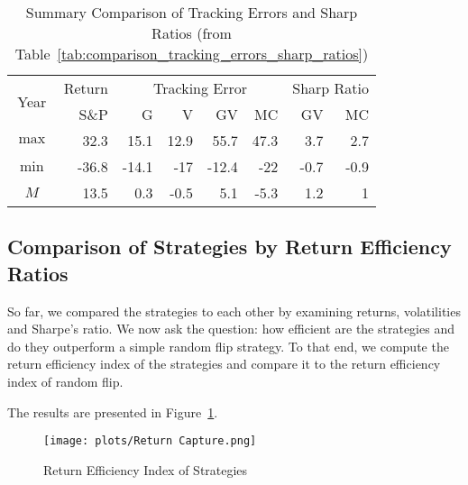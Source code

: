 \documentclass{article}
\begin{document}
\begin{table}[!ht]
    \centering
    \caption{Summary Comparison of Tracking Errors 
    and Sharp Ratios (from Table~\ref{tab:comparison_tracking_errors_sharp_ratios})}
    \medskip
\begin{tabular}{ c | r || rr || rr || rr}
\hline
\multirow{2}{*}{Year} & \multicolumn{1}{c||}{Return}   & \multicolumn{4}{c||}{Tracking Error} 
& \multicolumn{2}{c}{Sharp Ratio}   \\ \cline{2-8}
  & S\&P & G & V  & GV  & MC  & GV  & MC  \\ 
\hline
        $\max$ & 32.3 & \cellcolor{green!25}15.1 & 12.9 & \cellcolor{green!25}55.7 & 47.3 & \cellcolor{green!25}3.7 & 2.7 \\ 
        $\min$ & -36.8 & \cellcolor{green!25}-14.1 & -17 & \cellcolor{green!25}-12.4 & -22 & \cellcolor{green!25}-0.7 & -0.9 \\ 
        $M$ & 13.5 & \cellcolor{green!25}0.3 & -0.5 & \cellcolor{green!25}5.1 & -5.3 & \cellcolor{green!25}1.2 & 1 \\ 
\hline
\end{tabular}
\label{tab:comparison_tracking_errors_sharpe_ratios_summary}
\end{table}

\subsection{Comparison of Strategies by Return Efficiency Ratios}

So far, we compared the strategies to each other by examining returns, volatilities and Sharpe's ratio. 
We now ask the question: how efficient are the strategies and do they outperform a simple random flip strategy.
To that end, we compute the return efficiency index of the strategies and compare it to the return efficiency index of random flip.

The results are presented in Figure~\ref{fig:Return Capture}.

\begin{figure}[htbp]
  \centering
  \texttt{[image: plots/Return Capture.png]}
  \caption{Return Efficiency Index of Strategies}
  \label{fig:Return Capture}
\end{figure}
\end{document}
